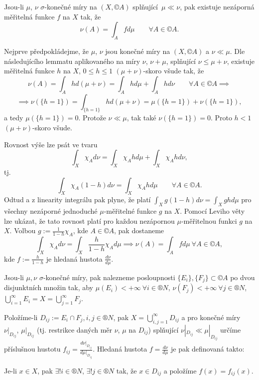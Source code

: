 \documentclass[12pt]{article}					%
\begin{document}
\begin{veta}
	Jsou-li $\mu$, $\nu$ $\sigma$-konečné míry na $(X, ©A)$ splňující $\mu \ll \nu$, pak existuje nezáporná měřitelná funkce $f$ na $X$ tak, že
	$$ \nu(A) = \int_A f d\mu \qquad \forall A \in ©A. $$

	\begin{dukazin}
		Nejprve předpokládejme, že $\mu$, $\nu$ jsou konečné míry na $(X, ©A)$ a $\nu \ll \mu$. Dle následujícího lemmatu aplikovaného na míry $\nu$, $\nu + \mu$, splňující $\nu ≤ \mu + \nu$, existuje měřitelná funkce $h$ na $X$, $0 ≤ h ≤ 1$ $(\mu + \nu)$-skoro všude tak, že
		$$ \nu(A) = \int_A h d(\mu + \nu) = \int_A h d\mu + \int_A h d\nu \qquad \forall A \in ©A \implies $$
		$$ \implies \nu(\{h = 1\}) = \int_{\{h=1\}} h d(\mu + \nu) = \mu(\{h = 1\}) + \nu(\{h = 1\}), $$
		a tedy $\mu(\{h = 1\}) = 0$. Protože $\nu \ll \mu$, tak také $\nu(\{h = 1\}) = 0$. Proto $h < 1$ $(\mu + \nu)$-skoro všude.

		Rovnost výše lze psát ve tvaru
		$$ \int_X \chi_A d\nu = \int_X \chi_A h d\mu + \int_X \chi_A h d\nu, $$
		tj.
		$$ \int_X \chi_A (1 - h) d\nu = \int_X \chi_A h d\mu \qquad \forall A \in ©A. $$
		Odtud a z linearity integrálu pak plyne, že platí $\int_X g (1 - h) d\nu = \int_X g h d\mu$ pro všechny nezáporné jednoduché $\mu$-měřitelné funkce $g$ na $X$. Pomocí Leviho věty lze ukázat, že tato rovnost platí pro každou nezápornou $\mu$-měřitelnou funkci $g$ na $X$. Volbou $g := \frac{1}{1 - h} \chi_A$, kde $A \in ©A$, pak dostaneme
		$$ \int_X \chi_A d\nu = \int_X \frac{h}{1 - h} \chi_A d\mu \implies \nu(A) = \int_A f d\mu\ \forall A \in ©A, $$
		kde $f := \frac{h}{1 - h}$ je hledaná hustota $\frac{d\nu}{d\mu}$.

		Jsou-li $\mu, \nu$ $\sigma$-konečné míry, pak nalezneme posloupnosti $\{E_i\}, \{F_j\} \subset ©A$ po dvou disjunktních množin tak, aby $\mu(E_i) < +∞\ \forall i \in ®N$, $\nu(F_j) < +∞\ \forall j \in ®N$, $\bigcup_{i=1}^∞ E_i = X = \bigcup_{j=1}^∞ F_j$.

		Položíme-li $D_{ij} := E_i \cap F_j, i, j \in ®N$, pak $X = \bigcup_{i,j=1}^∞ D_{ij}$ a pro konečné míry $\nu|_{D_{ij}}$, $\mu|_{D_{ij}}$ (tj. restrikce daných měr $\nu$, $\mu$ na $D_{ij}$) splňující $\nu|_{D_{ij}} \ll \mu|_{D_{ij}}$ určíme příslušnou hustotu $f_{ij} = \frac{d\nu|_{D_{ij}}}{d\mu|_{D_{ij}}}$. Hledaná hustota $f = \frac{d\nu}{d\mu}$ je pak definovaná takto:

		Je-li $x \in X$, pak $\exists!i \in ®N$, $\exists!j \in ®N$ tak, že $x \in D_{ij}$ a položíme $f(x) = f_{ij}(x)$.
	\end{dukazin}
\end{veta}
\end{document}
